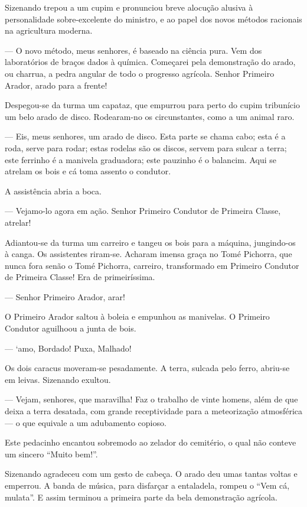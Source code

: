 Sizenando trepou a um cupim e pronunciou breve alocução alusiva à
personalidade sobre-excelente do ministro, e ao papel dos novos métodos
racionais na agricultura moderna.

--- O novo método, meus senhores, é baseado na ciência pura. Vem dos
laboratórios de braços dados à química. Começarei pela demonstração do
arado, ou charrua, a pedra angular de todo o progresso agrícola. Senhor
Primeiro Arador, arado para a frente!

Despegou-se da turma um capataz, que empurrou para perto do cupim
tribunício um belo arado de disco. Rodearam-no os circunstantes, como a
um animal raro.

--- Eis, meus senhores, um arado de disco. Esta parte se chama cabo;
esta é a roda, serve para rodar; estas rodelas são os discos, servem
para sulcar a terra; este ferrinho é a manivela graduadora; este
pauzinho é o balancim. Aqui se atrelam os bois e cá toma assento o
condutor.

A assistência abria a boca.

--- Vejamo-lo agora em ação. Senhor Primeiro Condutor de Primeira
Classe, atrelar!

Adiantou-se da turma um carreiro e tangeu os bois para a máquina,
jungindo-os à canga. Os assistentes riram-se. Acharam imensa graça no
Tomé Pichorra, que nunca fora senão o Tomé Pichorra, carreiro,
transformado em Primeiro Condutor de Primeira Classe! Era de
primeiríssima.

--- Senhor Primeiro Arador, arar!

O Primeiro Arador saltou à boleia e empunhou as manivelas. O Primeiro
Condutor aguilhoou a junta de bois.

--- `amo, Bordado! Puxa, Malhado!

Os dois caracus moveram-se pesadamente. A terra, sulcada pelo ferro,
abriu-se em leivas. Sizenando exultou.

--- Vejam, senhores, que maravilha! Faz o trabalho de vinte homens, além
de que deixa a terra desatada, com grande receptividade para a
meteorização atmosférica --- o que equivale a um adubamento copioso.

Este pedacinho encantou sobremodo ao zelador do cemitério, o qual não
conteve um sincero ``Muito bem!''.

Sizenando agradeceu com um gesto de cabeça. O arado deu umas tantas
voltas e emperrou. A banda de música, para disfarçar a entaladela,
rompeu o ``Vem cá, mulata''. E assim terminou a primeira parte da bela
demonstração agrícola.

